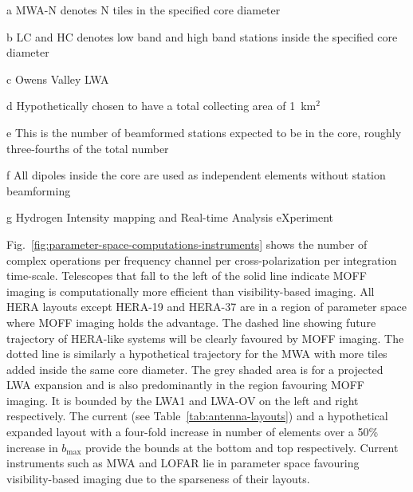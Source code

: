\documentclass[a4paper,fleqn,usenatbib]{mnras}
\begin{document}
\begin{table}
\begin{threeparttable}
  \begin{tablenotes}
    \item[a] MWA-N denotes N tiles in the specified core diameter
    \item[b] LC and HC denotes low band and high band stations inside the specified core diameter 
    \item[c] Owens Valley LWA
    \item[d] Hypothetically chosen to have a total collecting area of 1~km$^2$
    \item[e] This is the number of beamformed stations expected to be in the core, roughly three-fourths of the total number
    \item[f] All dipoles inside the core are used as independent elements without station beamforming
    \item[g] Hydrogen Intensity mapping and Real-time Analysis eXperiment
  \end{tablenotes}
  \end{threeparttable}
\end{table}

Fig.~\ref{fig:parameter-space-computations-instruments} shows the number of complex operations per frequency channel per cross-polarization per integration time-scale. Telescopes that fall to the left of the solid line indicate MOFF imaging is computationally more efficient than visibility-based imaging. All HERA layouts except HERA-19 and HERA-37 are in a region of parameter space where MOFF imaging holds the advantage. The dashed line showing future trajectory of HERA-like systems will be clearly favoured by MOFF imaging. The dotted line is similarly a hypothetical trajectory for the MWA with more tiles added inside the same core diameter. The grey shaded area is for a projected LWA expansion and is also predominantly in the region favouring MOFF imaging. It is bounded by the LWA1 and LWA-OV on the left and right respectively. The current (see Table~\ref{tab:antenna-layouts}) and a hypothetical expanded layout with a four-fold increase in number of elements over a 50\% increase in $b_\textrm{max}$ provide the bounds at the bottom and top respectively. Current instruments such as MWA and LOFAR lie in parameter space favouring visibility-based imaging due to the sparseness of their layouts. 
\end{document}
